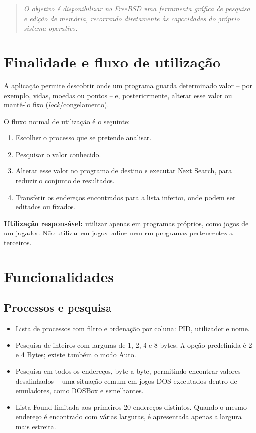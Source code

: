 \documentclass[11pt,a4paper]{article}
\newcommand{\key}[1]{\textsf{#1}}
\begin{document}
\begin{quote}\small\color{muted}
  \textit{O objetivo é disponibilizar no FreeBSD uma ferramenta gráfica de pesquisa e edição de memória, recorrendo diretamente às capacidades do próprio sistema operativo.}
\end{quote}

\section{Finalidade e fluxo de utilização}

A aplicação permite descobrir onde um programa guarda determinado valor -- por exemplo, vidas, moedas ou pontos -- e, posteriormente, alterar esse valor ou mantê-lo fixo (\textit{lock}/congelamento).

O fluxo normal de utilização é o seguinte:
\begin{enumerate}
  \item Escolher o processo que se pretende analisar.
  \item Pesquisar o valor conhecido.
  \item Alterar esse valor no programa de destino e executar \key{Next Search}, para reduzir o conjunto de resultados.
  \item Transferir os endereços encontrados para a lista inferior, onde podem ser editados ou fixados.
\end{enumerate}

\textbf{Utilização responsável:} utilizar apenas em programas próprios, como jogos de um jogador. Não utilizar em jogos online nem em programas pertencentes a terceiros.

\section{Funcionalidades}

\subsection{Processos e pesquisa}
\begin{itemize}
  \item Lista de processos com filtro e ordenação por coluna: PID, utilizador e nome.
  \item Pesquisa de inteiros com larguras de 1, 2, 4 e 8 bytes. A opção predefinida é \key{2 e 4 Bytes}; existe também o modo \key{Auto}.
  \item Pesquisa em todos os endereços, byte a byte, permitindo encontrar valores desalinhados -- uma situação comum em jogos DOS executados dentro de emuladores, como DOSBox e semelhantes.
  \item Lista \key{Found} limitada aos primeiros 20 endereços distintos. Quando o mesmo endereço é encontrado com várias larguras, é apresentada apenas a largura mais estreita.
\end{itemize}
\end{document}

